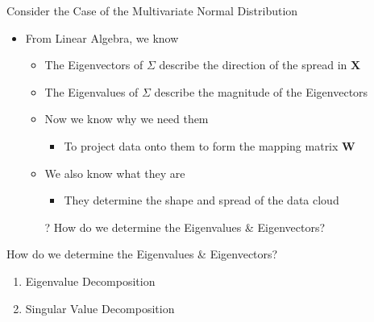 \documentclass[aspectratio=169]{beamer}
\begin{document}
\begin{frame}{Consider the Case of the  Multivariate Normal Distribution}
\begin{itemize}

	\item From Linear Algebra, we know
\begin{itemize}
	\item The Eigenvectors of $\Sigma$ describe the direction of the spread in $\textbf{X}$
	\item The Eigenvalues of $\Sigma$ describe the magnitude of the Eigenvectors
	\item[] 
	\vspace{1em}
\item Now we know why we need them
\begin{itemize}
	\item To project data onto them to form the mapping matrix  $\textbf{W}$
\end{itemize}
\item We also know what they are
\begin{itemize}
	\item They determine the shape and spread of the data cloud
\end{itemize}
\item[?] How do we determine the Eigenvalues  \& Eigenvectors?
\end{itemize}
\end{itemize}

\end{frame}
\begin{frame}{How do we determine the Eigenvalues  \& Eigenvectors?}
\begin{enumerate}

\item Eigenvalue Decomposition
\item Singular Value Decomposition 
\end{enumerate}

\end{frame}
\end{document}

